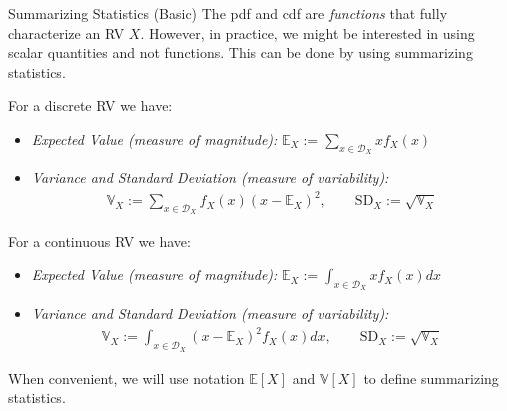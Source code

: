 \documentclass[9pt]{beamer}
\begin{document}
%
\begin{frame}{Summarizing Statistics (Basic)}
The pdf and cdf are {\em functions} that fully characterize an RV $X$. However, in practice, we might be interested in using scalar quantities and not functions.  This can be done by using summarizing statistics. 
\begin{block}{}
For a discrete RV we have:
\begin{itemize}
\item {\em Expected Value (measure of magnitude):} $\mathbb{E}_X:=\sum_{x\in {\mathcal{D}}_X}x{f}_X(x)$

\item {\em Variance and Standard Deviation (measure of variability):} 
\begin{align*}
\mathbb{V}_X:=\sum_{x\in {\mathcal{D}}_X}f_X(x)(x-\mathbb{E}_X)^2,\qquad \textrm{SD}_X:=\sqrt{\mathbb{V}_X}
\end{align*}
\end{itemize}
\end{block}

\begin{block}{}
For a continuous RV we have:
\begin{itemize}
\item {\em Expected Value (measure of magnitude):}  $\mathbb{E}_X:=\int_{x\in {\mathcal{D}}_X}x{f}_X(x)dx$
\item {\em Variance and Standard Deviation (measure of variability):} 
\begin{align*}
\mathbb{V}_X:=\int_{x\in {\mathcal{D}}_X}(x-\mathbb{E}_X)^2f_X(x)dx,\qquad \textrm{SD}_X:=\sqrt{\mathbb{V}_X}
\end{align*}
\end{itemize}
\end{block}
When convenient, we will use notation $\mathbb{E}[X]$ and $\mathbb{V}[X]$ to define summarizing statistics. 
\end{frame}
\end{document}
